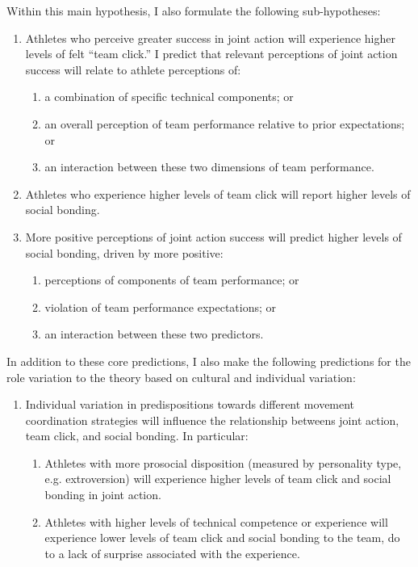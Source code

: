 \begin{CJK}{UTF8}{gbsn}
        Within this main hypothesis, I also formulate the following sub-hypotheses:
        \begin{enumerate}
          \item Athletes who perceive greater success in joint action will experience higher levels of felt ``team click.'' I predict that relevant perceptions of joint action success will relate to athlete perceptions of:
            \begin{enumerate}
              \item a combination of specific technical components; or
              \item an overall perception of team performance relative to prior expectations; or
              \item an interaction between these two dimensions of team performance.
            \end{enumerate}
          \item Athletes who experience higher levels of team click will report higher levels of social bonding.
          \item More positive perceptions of joint action success will predict higher levels of social bonding, driven by more positive:
          \begin{enumerate}
            \item perceptions of components of team performance; or
            \item violation of team performance expectations; or
            \item an interaction between these two predictors.
          \end{enumerate}
        \end{enumerate}

    In addition to these core predictions, I also make the following predictions for the role variation to the theory based on cultural and individual variation:

    \begin{enumerate}
      \item Individual variation in predispositions towards different movement coordination strategies will influence the relationship betweens joint action, team click, and social bonding.  In particular:
          \begin{enumerate}
            \item Athletes with more prosocial disposition (measured by personality type, e.g. extroversion) will experience higher levels of team click and social bonding in joint action.
            \item Athletes with higher levels of technical competence or experience will experience lower levels of team click and social bonding to the team, do to a lack of surprise associated with the experience.
          \end{enumerate}


\end{enumerate}
\end{CJK}
